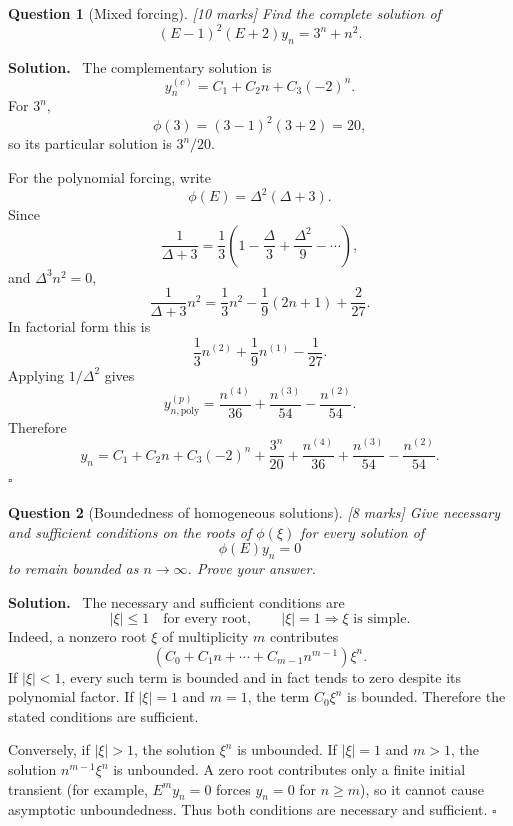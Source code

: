 \documentclass[11pt,a4paper]{article}
\theoremstyle{questionstyle}
\newtheorem{question}{Question}
\newenvironment{solution}
  {\par\noindent\textbf{\color{solutiongreen}Solution.}\ }
  {\hfill$\square$\par}
\newcommand{\pointmark}[1]{\hfill\textnormal{\textit{[#1 marks]}}}
\newcommand{\abs}[1]{\left|#1\right|}
\begin{document}
\begin{question}[Mixed forcing]\pointmark{10}
Find the complete solution of
\[
  (E-1)^2(E+2)y_n=3^n+n^2.
\]
\end{question}

\begin{solution}
The complementary solution is
\[
  y_n^{(c)}=C_1+C_2n+C_3(-2)^n.
\]
For \(3^n\),
\[
  \phi(3)=(3-1)^2(3+2)=20,
\]
so its particular solution is \(3^n/20\).

For the polynomial forcing, write
\[
  \phi(E)=\Delta^2(\Delta+3).
\]
Since
\[
  \frac1{\Delta+3}
  =\frac13\left(1-\frac{\Delta}{3}
  +\frac{\Delta^2}{9}-\cdots\right),
\]
and \(\Delta^3n^2=0\),
\[
  \frac1{\Delta+3}n^2
  =\frac13n^2-\frac19(2n+1)+\frac{2}{27}.
\]
In factorial form this is
\[
  \frac13n^{(2)}+\frac19n^{(1)}-\frac1{27}.
\]
Applying \(1/\Delta^2\) gives
\[
  y_{n,\mathrm{poly}}^{(p)}
  =\frac{n^{(4)}}{36}
   +\frac{n^{(3)}}{54}
   -\frac{n^{(2)}}{54}.
\]
Therefore
\[
  \boxed{
  y_n=C_1+C_2n+C_3(-2)^n+\frac{3^n}{20}
  +\frac{n^{(4)}}{36}
  +\frac{n^{(3)}}{54}
  -\frac{n^{(2)}}{54}}.
\]
\end{solution}

\begin{question}[Boundedness of homogeneous solutions]\pointmark{8}
Give necessary and sufficient conditions on the roots of
\(\phi(\xi)\) for every solution of
\[
  \phi(E)y_n=0
\]
to remain bounded as \(n\to\infty\).  Prove your answer.
\end{question}

\begin{solution}
The necessary and sufficient conditions are
\[
  \abs{\xi}\leq1\quad\text{for every root},
  \qquad
  \abs{\xi}=1\Longrightarrow \xi
  \text{ is simple}.
\]
Indeed, a nonzero root \(\xi\) of multiplicity \(m\) contributes
\[
  (C_0+C_1n+\cdots+C_{m-1}n^{m-1})\xi^n.
\]
If \(\abs{\xi}<1\), every such term is bounded and in fact tends to
zero despite its polynomial factor.  If \(\abs{\xi}=1\) and \(m=1\),
the term \(C_0\xi^n\) is bounded.  Therefore the stated conditions are
sufficient.

Conversely, if \(\abs{\xi}>1\), the solution \(\xi^n\) is unbounded.
If \(\abs{\xi}=1\) and \(m>1\), the solution
\(n^{m-1}\xi^n\) is unbounded.  A zero root contributes only a finite
initial transient (for example, \(E^my_n=0\) forces \(y_n=0\) for
\(n\geq m\)), so it cannot cause asymptotic unboundedness.  Thus both
conditions are necessary and sufficient.
\end{solution}
\end{document}
